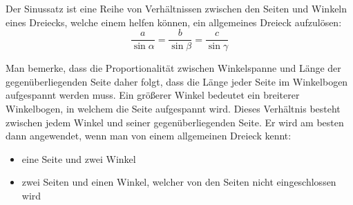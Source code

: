 
Der Sinussatz ist eine Reihe von Verh\"{a}ltnissen zwischen den Seiten und Winkeln eines Dreiecks, welche einem helfen k\"{o}nnen, ein allgemeines Dreieck aufzul\"{o}sen: $$\frac{a}{\sin \alpha} = \frac{b}{\sin \beta} = \frac{c}{\sin \gamma}$$


Man bemerke, dass die Proportionalit\"{a}t zwischen Winkelspanne und L\"{a}nge der gegen\"{u}berliegenden Seite daher folgt, dass die L\"{a}nge jeder Seite im Winkelbogen aufgespannt werden muss. Ein gr\"{o}\ss{}erer Winkel bedeutet ein breiterer Winkelbogen, in welchem die Seite aufgespannt wird. Dieses Verh\"{a}ltnis besteht zwischen jedem Winkel und seiner gegen\"{u}berliegenden Seite. Er wird am besten dann angewendet, wenn man von einem allgemeinen Dreieck kennt:
\begin{itemize}
	\item eine Seite und zwei Winkel
	\item zwei Seiten und einen Winkel, welcher von den Seiten nicht eingeschlossen wird
\end{itemize}

\begin{figure}[h!]
\end{figure}

\pagebreak



